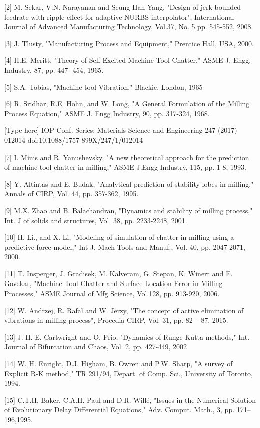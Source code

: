 \documentclass[10pt]{article}
\begin{document}
[2] M. Sekar, V.N. Narayanan and Seung-Han Yang, "Design of jerk bounded feedrate with ripple effect for adaptive NURBS interpolator", International Journal of Advanced Manufacturing Technology, Vol.37, No. 5 pp. 545-552, 2008.

[3] J. Tlusty, "Manufacturing Process and Equipment," Prentice Hall, USA, 2000.

[4] H.E. Meritt, "Theory of Self-Excited Machine Tool Chatter," ASME J. Engg. Industry, 87, pp. 447- 454, 1965.

[5] S.A. Tobias, "Machine tool Vibration," Blackie, London, 1965

[6] R. Sridhar, R.E. Hohn, and W. Long, "A General Formulation of the Milling Process Equation," ASME J. Engg Industry, 90, pp. 317-324, 1968.

[Type here] IOP Conf. Series: Materials Science and Engineering 247 (2017) 012014 doi:10.1088/1757-899X/247/1/012014

[7] I. Minis and R. Yanushevsky, "A new theoretical approach for the prediction of machine tool chatter in milling," ASME J.Engg Industry, 115, pp. 1-8, 1993.

[8] Y. Altintas and E. Budak, "Analytical prediction of stability lobes in milling," Annals of CIRP, Vol. 44, pp. 357-362, 1995.

[9] M.X. Zhao and B. Balachandran, "Dynamics and stability of milling process," Int. J of solids and structures, Vol. 38, pp. 2233-2248, 2001.

[10] H. Li., and X. Li, "Modeling of simulation of chatter in milling using a predictive force model," Int J. Mach Tools and Manuf., Vol. 40, pp. 2047-2071, 2000.

[11] T. Insperger, J. Gradisek, M. Kalveram, G. Stepan, K. Winert and E. Govekar, "Machine Tool Chatter and Surface Location Error in Milling Processes," ASME Journal of Mfg Science, Vol.128, pp. 913-920, 2006.

[12] W. Andrzej, R. Rafal and W. Jerzy, "The concept of active elimination of vibrations in milling process", Procedia CIRP, Vol. 31, pp. 82 – 87, 2015.

[13] J. H. E. Cartwright and O. Prio, "Dynamics of Runge-Kutta methods," Int. Journal of Bifurcation and Chaos, Vol. 2, pp. 427-449, 2002

[14] W. H. Enright, D.J. Higham, B. Owren and P.W. Sharp, "A survey of Explicit R-K method," TR 291/94, Depart. of Comp. Sci., University of Toronto, 1994.

[15] C.T.H. Baker, C.A.H. Paul and D.R. Willé, "Issues in the Numerical Solution of Evolutionary Delay Differential Equations," Adv. Comput. Math., 3, pp. 171–196,1995.
\end{document}

